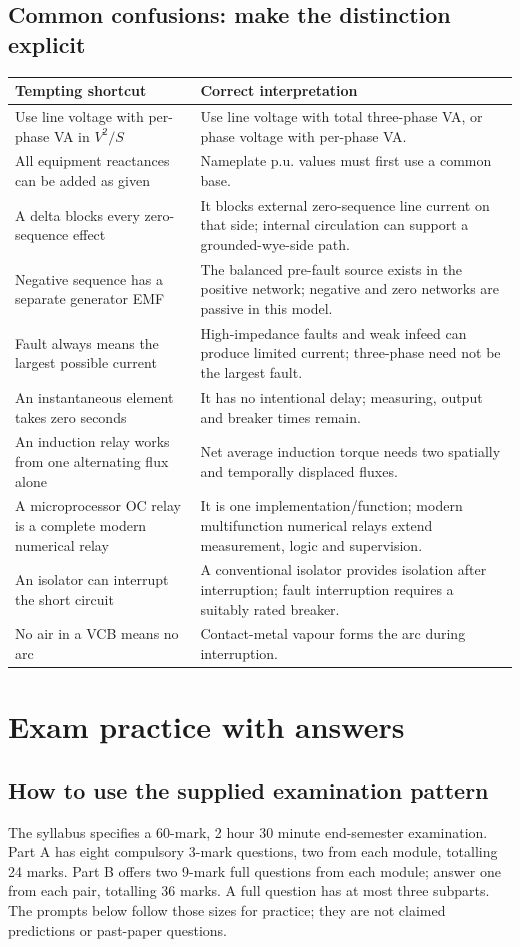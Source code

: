 \documentclass[11pt,a4paper]{article}
\newcommand{\chapterstart}[2]{\clearpage\section{#1}\label{#2}}
\begin{document}
\subsection{Common confusions: make the distinction explicit}
\begin{center}\small
\begin{tabularx}{\textwidth}{L{.42\textwidth}Y}
\toprule Tempting shortcut & Correct interpretation\\\midrule
Use line voltage with per-phase VA in $V^2/S$ & Use line voltage with total three-phase VA, or phase voltage with per-phase VA.\\
All equipment reactances can be added as given & Nameplate p.u. values must first use a common base.\\
A delta blocks every zero-sequence effect & It blocks external zero-sequence line current on that side; internal circulation can support a grounded-wye-side path.\\
Negative sequence has a separate generator EMF & The balanced pre-fault source exists in the positive network; negative and zero networks are passive in this model.\\
Fault always means the largest possible current & High-impedance faults and weak infeed can produce limited current; three-phase need not be the largest fault.\\
An instantaneous element takes zero seconds & It has no intentional delay; measuring, output and breaker times remain.\\
An induction relay works from one alternating flux alone & Net average induction torque needs two spatially and temporally displaced fluxes.\\
A microprocessor OC relay is a complete modern numerical relay & It is one implementation/function; modern multifunction numerical relays extend measurement, logic and supervision.\\
An isolator can interrupt the short circuit & A conventional isolator provides isolation after interruption; fault interruption requires a suitably rated breaker.\\
No air in a VCB means no arc & Contact-metal vapour forms the arc during interruption.\\\bottomrule
\end{tabularx}\end{center}

\chapterstart{Exam practice with answers}{practice}
\subsection{How to use the supplied examination pattern}
The syllabus specifies a 60-mark, 2 hour 30 minute end-semester examination. Part A has eight compulsory 3-mark questions, two from each module, totalling 24 marks. Part B offers two 9-mark full questions from each module; answer one from each pair, totalling 36 marks. A full question has at most three subparts. The prompts below follow those sizes for practice; they are not claimed predictions or past-paper questions.
\end{document}

